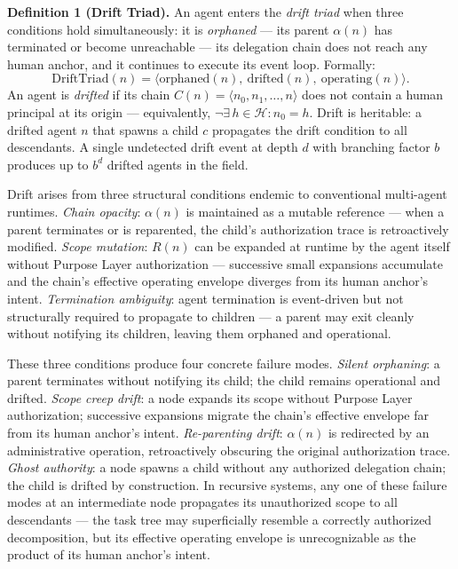 \medskip
\noindent\textbf{Definition 1 (Drift Triad).}
An agent enters the \emph{drift triad} when three conditions hold simultaneously: it is \emph{orphaned} — its parent $\alpha(n)$ has terminated or become unreachable — its delegation chain does not reach any human anchor, and it continues to execute its event loop. Formally:
\begin{equation}
\mathrm{DriftTriad}(n) = \langle \mathrm{orphaned}(n),\ \mathrm{drifted}(n),\ \mathrm{operating}(n) \rangle.
\label{eq:intro-drift-triad}
\end{equation}
An agent is \emph{drifted} if its chain $C(n) = \langle n_0, n_1, \ldots, n \rangle$ does not contain a human principal at its origin — equivalently, $\neg\exists\, h \in \mathcal{H} : n_0 = h$. Drift is heritable: a drifted agent $n$ that spawns a child $c$ propagates the drift condition to all descendants. A single undetected drift event at depth $d$ with branching factor $b$ produces up to $b^d$ drifted agents in the field.

Drift arises from three structural conditions endemic to conventional multi-agent runtimes. \emph{Chain opacity}: $\alpha(n)$ is maintained as a mutable reference — when a parent terminates or is reparented, the child's authorization trace is retroactively modified. \emph{Scope mutation}: $R(n)$ can be expanded at runtime by the agent itself without Purpose Layer authorization — successive small expansions accumulate and the chain's effective operating envelope diverges from its human anchor's intent. \emph{Termination ambiguity}: agent termination is event-driven but not structurally required to propagate to children — a parent may exit cleanly without notifying its children, leaving them orphaned and operational.

These three conditions produce four concrete failure modes. \emph{Silent orphaning}: a parent terminates without notifying its child; the child remains operational and drifted. \emph{Scope creep drift}: a node expands its scope without Purpose Layer authorization; successive expansions migrate the chain's effective envelope far from its human anchor's intent. \emph{Re-parenting drift}: $\alpha(n)$ is redirected by an administrative operation, retroactively obscuring the original authorization trace. \emph{Ghost authority}: a node spawns a child without any authorized delegation chain; the child is drifted by construction. In recursive systems, any one of these failure modes at an intermediate node propagates its unauthorized scope to all descendants — the task tree may superficially resemble a correctly authorized decomposition, but its effective operating envelope is unrecognizable as the product of its human anchor's intent.

